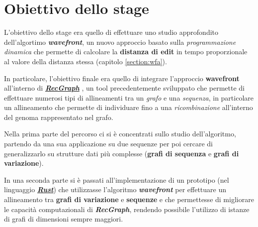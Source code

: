 \section{Obiettivo dello stage}
    L'obiettivo dello stage era quello di effettuare uno studio approfondito dell'algortimo \textbf{\textit{wavefront}}, un nuovo approccio basato sulla \emph{programmazione dinamica} che permette di calcolare la \textbf{distanza di edit} in tempo proporzionale al valore della distanza stessa (capitolo \ref{section:wfa}). 
    
    In particolare, l'obiettivo finale era quello di integrare l'approccio \textbf{\textbf{wavefront}} all'interno di \href{https://github.com/AlgoLab/RecGraph}{\textbf{\textit{RecGraph}}} \cite{Recgraph}, un tool precedentemente sviluppato che permette di effettuare numerosi tipi di allineamenti tra un \emph{grafo} e una \emph{sequenza}, in particolare un allineamento che permette di individuare fino a una \emph{ricombinazione} all'interno del genoma rappresentato nel grafo. 
    
    Nella prima parte del percorso ci si è concentrati sullo studio dell'algoritmo, partendo da una sua applicazione su due sequenze per poi cercare di generalizzarlo su strutture dati più complesse (\textbf{grafi di sequenza} e \textbf{grafi di variazione}).
    
    In una seconda parte si è passati all'implementazione di un prototipo (nel linguaggio \href{https://www.rust-lang.org/it}{\textbf{\textit{Rust}}}) che utilizzasse l'algoritmo \textbf{\textit{wavefront}} per effettuare un allineamento tra \textbf{grafi di variazione} e \textbf{sequenze} e che permettesse di migliorare le capacità computazionali di \textbf{\textit{RecGraph}}, rendendo possibile l'utilizzo di istanze di grafi di dimensioni sempre maggiori.  